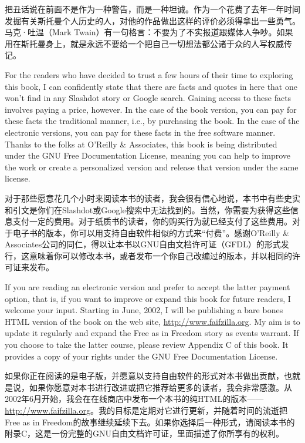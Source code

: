 \ifdefined\chs
把丑话说在前面不是作为一种警告，而是一种坦诚。作为一个花费了去年一年时间发掘有关斯托曼个人历史的人，对他的作品做出这样的评价必须得拿出一些勇气。马克·吐温（Mark Twain）有一句格言：不要为了不实报道跟媒体人争吵。如果用在斯托曼身上，就是永远不要给一个把自己一切想法都公诸于众的人写权威传记。
\fi

\ifdefined\eng
For the readers who have decided to trust a few hours of their time to exploring this book, I can confidently state that there are facts and quotes in here that one won't find in any Slashdot story or Google search. Gaining access to these facts involves paying a price, however. In the case of the book version, you can pay for these facts the traditional manner, i.e., by purchasing the book. In the case of the electronic versions, you can pay for these facts in the free software manner. Thanks to the folks at O'Reilly \& Associates, this book is being distributed under the GNU Free Documentation License, meaning you can help to improve the work or create a personalized version and release that version under the same license.
\fi

\ifdefined\chs
对于那些愿意花几个小时来阅读本书的读者，我会很有信心地说，本书中有些史实和引文是你们在Slashdot或Google搜索中无法找到的。当然，你需要为获得这些信息支付一定的费用。对于纸质书的读者，你的购买行为就已经支付了这些费用。对于电子书的版本，你可以用支持自由软件相似的方式来``付费''。感谢O’Reilly \& Associates公司的同仁，得以让本书以GNU自由文档许可证（GFDL）的形式发行，这意味着你可以修改本书，或者发布一个你自己改编过的版本，并以相同的许可证来发布。
\fi

\ifdefined\eng
If you are reading an electronic version and prefer to accept the latter payment option, that is, if you want to improve or expand this book for future readers, I welcome your input. Starting in June, 2002, I will be publishing a bare bones HTML version of the book on the web site, \url{http://www.faifzilla.org}. My aim is to update it regularly and expand the Free as in Freedom story as events warrant. If you choose to take the latter course, please review Appendix C of this book. It provides a copy of your rights under the GNU Free Documentation License.
\fi

\ifdefined\chs
如果你正在阅读的是电子版，并愿意以支持自由软件的形式对本书做出贡献，也就是说，如果你愿意对本书进行改进或把它推荐给更多的读者，我会非常感激。从2002年6月开始，我会在在线商店中发布一个本书的纯HTML的版本——\url{http://www.faifzilla.org}。我的目标是定期对它进行更新，并随着时间的流逝把Free as in Freedom的故事继续延续下去。如果你选择后一种形式，请阅读本书的附录C，这是一份完整的GNU自由文档许可证，里面描述了你所享有的权利。
\fi

